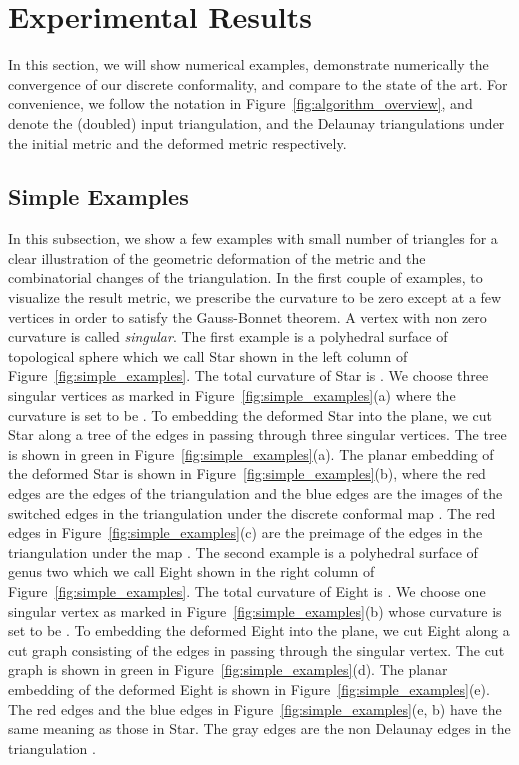 \documentclass[11pt]{article}
\begin{document}
\section{Experimental Results}
In this section, we will show numerical examples, demonstrate numerically 
the convergence of our discrete conformality, and compare to the state of the art. 
For convenience, we follow the notation in Figure~\ref{fig:algorithm_overview}, and 
denote  the (doubled) input triangulation,  and  the Delaunay triangulations
under the initial metric  and the deformed metric  respectively. 

\subsection{Simple Examples}
\label{sec:simple-examples}
In this subsection, we show a few examples with small number of triangles 
for a clear illustration of the geometric deformation of the metric and the 
combinatorial changes of the triangulation. In the first couple of examples, 
to visualize the result metric, we prescribe the curvature to be zero except at 
a few vertices in order to satisfy the Gauss-Bonnet theorem. A vertex with non 
zero curvature is called {\it singular}. The first example is a polyhedral surface of 
topological sphere which we call Star shown in the left column of 
Figure~\ref{fig:simple_examples}. The total curvature 
of Star is . We choose three singular vertices as marked in 
Figure~\ref{fig:simple_examples}(a) where the curvature is set to be . 
To embedding the deformed
Star into the plane, we cut Star along a tree of the edges in  passing through three singular 
vertices. The tree is shown in green in Figure~\ref{fig:simple_examples}(a). 
The planar embedding of the deformed Star is shown in Figure~\ref{fig:simple_examples}(b),
where the red edges are the edges of the triangulation  and the blue edges are the images 
of the switched edges in the triangulation  under the discrete conformal map . 
The red edges in Figure~\ref{fig:simple_examples}(c) are the preimage of the edges in the 
triangulation  under the map .  The second example is a polyhedral surface of 
genus two which we call Eight shown in the right column of Figure~\ref{fig:simple_examples}. 
The total curvature of Eight is . We choose one singular vertex  as marked in 
Figure~\ref{fig:simple_examples}(b)  whose curvature is set to be  .
To embedding the deformed Eight into the plane, we cut Eight
along a cut graph consisting of the edges in  passing through the singular vertex.
The cut graph is shown in green in Figure~\ref{fig:simple_examples}(d). 
The planar embedding of the deformed Eight is shown in Figure~\ref{fig:simple_examples}(e). 
The red edges and the blue edges in 
Figure~\ref{fig:simple_examples}(e, b) have the same meaning as those in Star. The gray edges
are the non Delaunay edges in the triangulation . 
\end{document}
